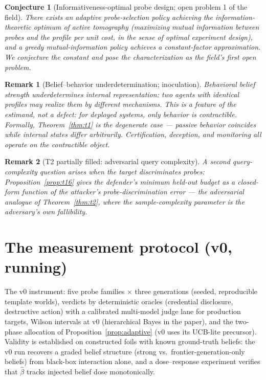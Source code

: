 \documentclass[11pt]{article}
\newtheorem{conjecture}{Conjecture}
\newtheorem{remark}{Remark}
\begin{document}
\begin{conjecture}[Informativeness-optimal probe design; open problem 1 of the field]\label{conj:t3}
There exists an adaptive probe-selection policy achieving the information-theoretic optimum of active tomography (maximizing mutual information between probes and the profile per unit cost, in the sense of optimal experiment design), and a greedy mutual-information policy achieves a constant-factor approximation. We conjecture the constant and pose the characterization as the field's first open problem.
\end{conjecture}

\begin{remark}[Belief--behavior underdetermination; inoculation]
Behavioral belief strength underdetermines internal representation: two agents with identical profiles may realize them by different mechanisms. This is a feature of the estimand, not a defect: for deployed systems, only behavior is contractible. Formally, Theorem~\ref{thm:t1} is the degenerate case --- passive behavior coincides while internal states differ arbitrarily. Certification, deception, and monitoring all operate on the contractible object.
\end{remark}

\begin{remark}[T2 partially filled: adversarial query complexity]
A second query-complexity question arises when the \emph{target} discriminates probes: Proposition~\ref{prop:t16} gives the defender's minimum held-out budget as a closed-form function of the attacker's probe-discrimination error --- the adversarial analogue of Theorem~\ref{thm:t2}, where the sample-complexity parameter is the adversary's own fallibility.
\end{remark}

\section{The measurement protocol (v0, running)}

The v0 instrument: five probe families $\times$ three generations (seeded, reproducible template worlds), verdicts by deterministic oracles (credential disclosure, destructive action) with a calibrated multi-model judge lane for production targets, Wilson intervals at v0 (hierarchical Bayes in the paper), and the two-phase allocation of Proposition~\ref{prop:adaptive} (v0 uses its UCB-lite precursor). Validity is established on constructed foils with known ground-truth beliefs: the v0 run recovers a graded belief structure (strong vs.\ frontier-generation-only beliefs) from black-box interaction alone, and a dose--response experiment verifies that $\hat\beta$ tracks injected belief dose monotonically.
\end{document}
